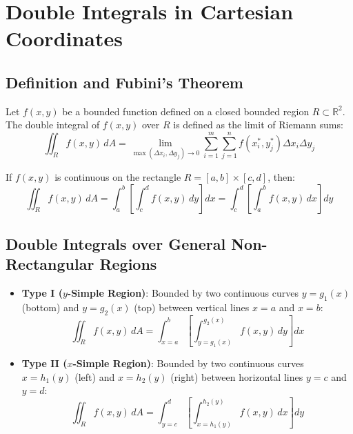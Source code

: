 \section{Double Integrals in Cartesian Coordinates}

\subsection{Definition and Fubini's Theorem}

\begin{definition}
Let $f(x,y)$ be a bounded function defined on a closed bounded region $R \subset \mathbb{R}^2$. The double integral of $f(x,y)$ over $R$ is defined as the limit of Riemann sums:
\begin{equation}
    \iint_R f(x,y)\,dA = \lim_{\max(\Delta x_i, \Delta y_j)\to 0} \sum_{i=1}^m \sum_{j=1}^n f(x_i^*, y_j^*) \Delta x_i \Delta y_j
\end{equation}
\end{definition}

\begin{theorem}
If $f(x,y)$ is continuous on the rectangle $R = [a,b] \times [c,d]$, then:
\begin{equation}
    \iint_R f(x,y)\,dA = \int_a^b \left[ \int_c^d f(x,y)\,dy \right] dx = \int_c^d \left[ \int_a^b f(x,y)\,dx \right] dy
\end{equation}
\end{theorem}

\subsection{Double Integrals over General Non-Rectangular Regions}
\begin{itemize}[leftmargin=1.5em]
    \item \textbf{Type I ($y$-Simple Region)}: Bounded by two continuous curves $y = g_1(x)$ (bottom) and $y = g_2(x)$ (top) between vertical lines $x = a$ and $x = b$:
    \begin{equation}
        \iint_R f(x,y)\,dA = \int_{x=a}^b \left[ \int_{y=g_1(x)}^{g_2(x)} f(x,y)\,dy \right] dx
    \end{equation}
    \item \textbf{Type II ($x$-Simple Region)}: Bounded by two continuous curves $x = h_1(y)$ (left) and $x = h_2(y)$ (right) between horizontal lines $y = c$ and $y = d$:
    \begin{equation}
        \iint_R f(x,y)\,dA = \int_{y=c}^d \left[ \int_{x=h_1(y)}^{h_2(y)} f(x,y)\,dx \right] dy
    \end{equation}
\end{itemize}

